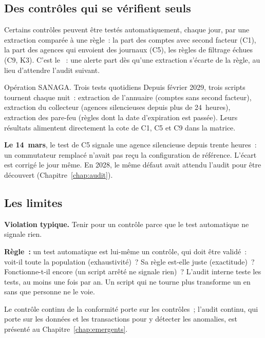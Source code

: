 \subsection{Des contrôles qui se vérifient seuls}

Certains contrôles peuvent être testés automatiquement, chaque jour, par
une extraction comparée à une règle~: la part des comptes avec second
facteur (C1), la part des agences qui envoient des journaux (C5), les
règles de filtrage échues (C9, K3). C'est le ~: une alerte part
dès qu'une extraction s'écarte de la règle, au lieu d'attendre l'audit
suivant.

\begin{boxscenario}{Opération SANAGA. Trois tests quotidiens}
Depuis février 2029, trois scripts tournent chaque nuit~: extraction de
l'annuaire (comptes sans second facteur), extraction du collecteur
(agences silencieuses depuis plus de 24~heures), extraction des pare-feu
(règles dont la date d'expiration est passée). Leurs résultats alimentent
directement la cote de C1, C5 et C9 dans la matrice.

\medskip
\textbf{Le 14~mars}, le test de C5 signale une agence silencieuse depuis
trente heures~: un commutateur remplacé n'avait pas reçu la configuration
de référence. L'écart est corrigé le jour même. En 2028, le même défaut
avait attendu l'audit pour être découvert (Chapitre~\ref{chap:audit}).
\end{boxscenario}

\subsection{Les limites}

\begin{boxalert}
\textbf{Violation typique.} Tenir pour \OUI{} un contrôle parce que le test
automatique ne signale rien.

\smallskip
\textbf{Règle~:} un test automatique est lui-même un contrôle, qui doit
être validé~: voit-il toute la population (exhaustivité)~? Sa règle
est-elle juste (exactitude)~? Fonctionne-t-il encore (un script arrêté ne
signale rien)~? L'audit interne teste les tests, au moins une fois par an.
Un script qui ne tourne plus transforme un \OUI{} en \NEK{} sans que
personne ne le voie.
\end{boxalert}

Le contrôle continu de la conformité porte sur les contrôles~; l'audit
continu, qui porte sur les données et les transactions pour y détecter les
anomalies, est présenté au Chapitre~\ref{chap:emergents}.

